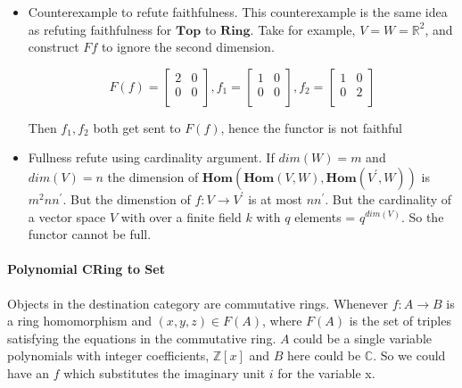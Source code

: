 \documentclass{article}
\begin{document}
\begin{itemize}

\item Counterexample to refute faithfulness. This counterexample is the same idea as refuting faithfulness for $\mathbf{Top}$ to $\mathbf{Ring}$. Take for example, $V = W = \mathds{R}^2$, and construct $Ff$ to ignore the second dimension.

\begin{equation*}
F(f) =
\begin{bmatrix}
2 & 0 \\
0 & 0 \\
\end{bmatrix},
f_1 =
\begin{bmatrix}
1 & 0 \\
0 & 0 \\
\end{bmatrix},
f_2 =
\begin{bmatrix}
1 & 0 \\
0 & 2 \\
\end{bmatrix}
\end{equation*}

Then $f_1, f_2$ both get sent to $F(f)$, hence the functor is not faithful

\item Fullness refute using cardinality argument. If $dim(W) = m$ and $dim(V) = n$ the dimension of $\mathbf{Hom}(\mathbf{Hom}(V,W), \mathbf{Hom}(V^{\prime},W))$ is $m^2nn^{\prime}$.  But the dimenstion of $f: V \rightarrow V^{\prime}$ is at most $nn^\prime$. But the cardinality of a vector space $V$ with over a finite field $k$ with $q$ elements = $q^{dim(V)}$. So the functor cannot be full.

\end{itemize}

\paragraph{Polynomial CRing to Set}

Objects in the destination category are commutative rings. Whenever $f\colon A \rightarrow B$ is a ring homomorphism and $(x,y,z) \in F(A)$, where $F(A)$ is the set of triples satisfying the equations in the commutative ring.  $A$ could be a single variable polynomials with integer coefficients, $\mathds{Z}[x]$ and $B$ here could be $\mathds{C}$. So we could have an $f$ which substitutes the imaginary unit $i$ for the variable x.
\end{document}
